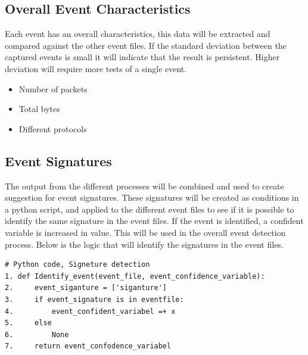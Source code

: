 \subsection{Overall Event Characteristics}
Each event has an overall characteristics, this data will be extracted and compared against the other event files. If the standard deviation between the captured events is small it will indicate that the result is persistent. Higher deviation will require more tests of a single event.
\begin{itemize}
    \item Number of packets
    \item Total bytes
    \item Different protocols
\end{itemize}

\subsection{Event Signatures}
The output from the different processes will be combined and used to create suggestion for event signatures. These signatures will be created as conditions in a python script, and applied to the different event files to see if it is possible to identify the same signature in the event files. 
If the event is identified, a confident variable is increased in value. This will be used in the overall event detection process. Below is the logic that will identify the signatures in the event files.
\begin{lstlisting}
# Python code, Signeture detection
1. def Identify_event(event_file, event_confidence_variable):
2.     event_siganture = ['siganture']
3.     if event_signature is in eventfile:
4.         event_confident_variabel =+ x
5.     else
6.         None
7.     return event_confodence_variabel
\end{lstlisting}

